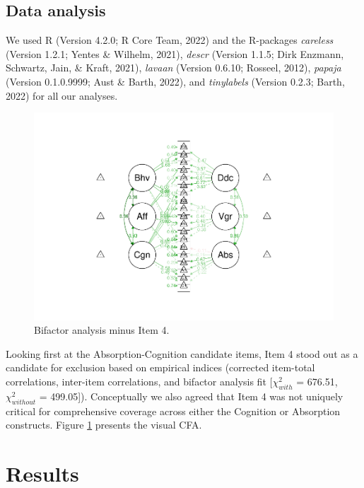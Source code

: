 \documentclass[
  man]{apa6}
\begin{document}
\hypertarget{data-analysis}{%
\subsection{Data analysis}\label{data-analysis}}

We used R (Version 4.2.0; R Core Team, 2022) and the R-packages \emph{careless} (Version 1.2.1; Yentes \& Wilhelm, 2021), \emph{descr} (Version 1.1.5; Dirk Enzmann, Schwartz, Jain, \& Kraft, 2021), \emph{lavaan} (Version 0.6.10; Rosseel, 2012), \emph{papaja} (Version 0.1.0.9999; Aust \& Barth, 2022), and \emph{tinylabels} (Version 0.2.3; Barth, 2022) for all our analyses.

\begin{figure}
\centering
\includegraphics{20to18_files/figure-latex/scalereduction-1.pdf}
\caption{\label{fig:scalereduction}Bifactor analysis minus Item 4.}
\end{figure}

Looking first at the Absorption-Cognition candidate items, Item 4 stood out as a candidate for exclusion based on empirical indices (corrected item-total correlations, inter-item correlations, and bifactor analysis fit {[}\(\chi^2_{with}\) = 676.51, \(\chi^2_{without}\) = 499.05{]}). Conceptually we also agreed that Item 4 was not uniquely critical for comprehensive coverage across either the Cognition or Absorption constructs. Figure \ref{fig:scalereduction} presents the visual CFA.

\hypertarget{results}{%
\section{Results}\label{results}}
\end{document}
